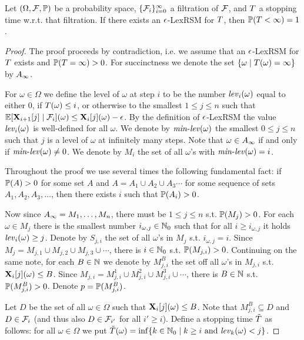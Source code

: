 \begin{theorem}
Let $(\Omega,\mathcal{F},\mathbb{P})$ be a probability space, 
$\{\mathcal{F}_i\}_{i=0}^{\infty}$ a filtration of $\mathcal{F}$, and $T$ a 
stopping 
time w.r.t. that filtration. If there exists an $\epsilon$-LexRSM for $T$, 
then $\mathbb{P}(T<\infty)=1$.
\end{theorem}
\begin{proof}
The proof proceeds by contradiction, i.e. we assume that an $\epsilon$-LexRSM for 
$T$ exists and $\mathbb{P}(T=\infty)>0$. For succinctness we denote the 
set $\{\omega\mid T(\omega)=\infty\}$ by $A_{\infty}$.

For $\omega\in \Omega$ we define the level of $\omega$ at step $i$ to be the 
number $\mathit{lev}_{i}(\omega)$ equal to either $0$, if $T(\omega)\leq i$, 
or otherwise to the smallest $1\leq j \leq n$ such that 
$\mathbb{E}[\mathbf{X}_{i+1}[j]\mid 
\mathcal{F}_i](\omega)\leq\mathbf{X}_{i}[j](\omega)-\epsilon$. By the definition of 
$\epsilon$-LexRSM the value $\mathit{lev}_{i}(\omega)$ is well-defined for all 
$\omega$. We denote by $\mathit{min}\text{-}\mathit{lev}(\omega)$ the smallest $0 \leq j \leq n$ such 
that $j$ is a level of $\omega$ at infinitely many steps. Note that $\omega \in 
A_{\infty}$ if and only if $\mathit{min}\text{-}\mathit{lev}(\omega)\neq 0$. We denote by $M_i$ 
the set of all $\omega$'s with $\mathit{min}\text{-}\mathit{lev}(\omega)=i$.

Throughout the proof we use several times the following fundamental fact: if 
$\mathbb{P}(A)>0$ for some set $A$ and $A=A_1\cup A_2 \cup A_3\cdots$ for some 
sequence of sets $A_1,A_2,A_3,\dots$, then there exists $i$ such that 
$\mathbb{P}(A_i)>0$.

Now since $A_{\infty}=M_1,\dots,M_n$, there must be $1\leq j \leq n$ 
s.t. $\mathbb{P}(M_j)>0$. For each $\omega\in M_j$ there is the smallest number
$i_{\omega,j}\in\mathbb{N}_0$ such that for all $i\geq i_{\omega,j}$ it holds 
$\mathit{lev}_{i}(\omega)\geq 
j$. Denote by $S_{j,i}$ the set of all $\omega$'s in $M_j$ s.t. 
$i_{\omega,j}=i$. 
Since $M_j = M_{j,1} \cup M_{j,2} \cup M_{j,3} \cup \cdots$, there is $i\in 
\mathbb{N}_0$ 
s.t. 
$\mathbb{P}(M_{j,i})>0$. Continuing on the same note, for each $B\in \mathbb{N}$ we 
denote by $M_{j,i}^{B}$ the set off all $\omega$'s in $M_{j,i}$ s.t. 
$\mathbf{X}_{i}[j](\omega)\leq B$. Since $M_{j,i}= M_{j,i}^{1} \cup M_{j,i}^{2} 
\cup M_{j,i}^{3} \cup \cdots  $, there is $B\in \mathbb{N}$ s.t. 
$\mathbb{P}(M_{j,i}^{B})>0$. Denote $p=\mathbb{P}(M_{j,i}^{B})$.

Let $D$ be the set of all $\omega\in \Omega$ such that 
$\mathbf{X}_{i}[j](\omega)\leq B$. Note that $M_{j,i}^{B} \subseteq D$ and $D\in 
\mathcal{F}_i$ (and thus also $D\in \mathcal{F}_{i'}$ for all $i'\geq i$). 
Define a stopping time $\tilde{T}$ as follows: for all $\omega \in \Omega$ 
we put 
$\tilde{T}(\omega)=\inf\{k\in \mathbb{N}_0 \mid k\geq i \text{ and }
\mathit{lev}_{k}(\omega) < j \}$.


\end{proof}
